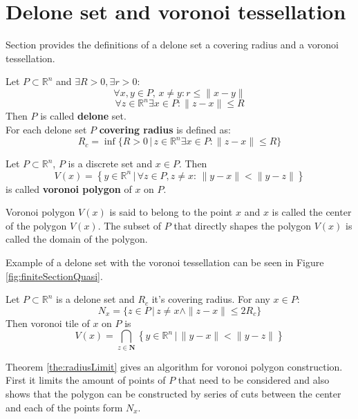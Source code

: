 \documentclass[text.tex]{subfiles}
\begin{document}
\section*{Delone set and voronoi tessellation}

Section provides the definitions of a delone set a covering radius and a voronoi tessellation.

\begin{definition}
\label{def:delone}
Let $P\subset \mathbb{R}^n$ and $\exists R>0, \exists r>0$:
$$\forall x,y\in P,\, x\neq y: r\leq \|x-y\|$$
$$\forall z\in\mathbb{R}^n \exists x\in P: \|z-x\|\leq R$$
Then $P$ is called \textbf{delone} set.\\
For each delone set $P$ \textbf{covering radius} is defined as:
$$R_c = \inf\{R>0\,|\, z\in\mathbb{R}^n \exists x\in P: \|z-x\|\leq R\}$$
\end{definition}

\begin{definition}
Let $P\subset \mathbb{R}^n$, $P$ is a discrete set and $x\in P$. Then
$$V(x) = \left\{ y \in \mathbb{R}^n \,|\, \forall z \in P, z\neq x:\, \|y-x\|<\|y-z\| \right\}$$
is called \textbf{voronoi polygon} of $x$ on $P$.

Voronoi polygon $V(x)$ is said to belong to the point $x$ and $x$ is called the center of the polygon $V(x)$. The subset of $P$ that directly shapes the polygon $V(x)$ is called the domain of the polygon.
\end{definition}

\begin{remark}
Example of a delone set with the voronoi tessellation can be seen in Figure \ref{fig:finiteSectionQuasi}.
\end{remark}

\begin{theorem}
\label{the:radiusLimit}
Let $P\subset \mathbb{R}^n$ is a delone set and $R_c$ it's covering radius. For any $x\in P$:
$$N_x = \{z\in P\,|\, z\neq x \wedge \|z-x\|\leq 2R_c\}$$
Then voronoi tile of $x$ on $P$ is
$$V(x) = \bigcap_{z\in \boldsymbol{N}} \left\{ y \in \mathbb{R}^n \,|\, \|y-x\|<\|y-z\| \right\}$$
\end{theorem}

\begin{remark}
Theorem \ref{the:radiusLimit} gives an algorithm for voronoi polygon construction. First it limits the amount of points of $P$ that need to be considered and also shows that the polygon can be constructed by series of cuts between the center and each of the points form $N_x$. 
\end{remark}
%
\clearpage
\end{document}
